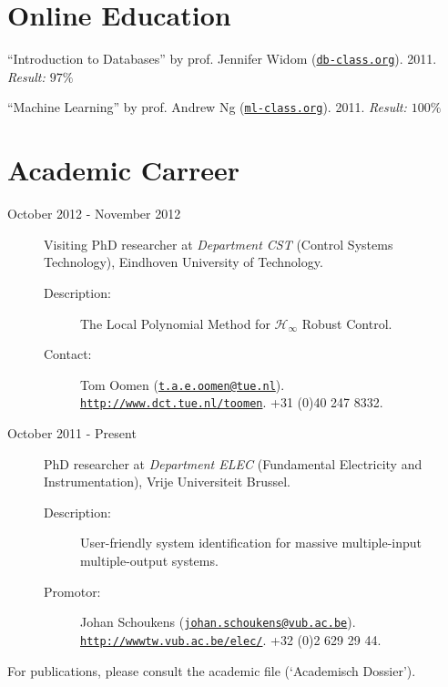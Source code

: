 \documentclass[a4paper]{article}
\renewenvironment{itemize}{
  \begin{list}{}{
    \setlength{\leftmargin}{1.5em}
  }
}{
  \end{list}
}
\begin{document}
\section*{Online Education}
  \begin{itemize}
    \item ``Introduction to Databases'' by prof. Jennifer Widom 
	      (\href{http://www.db-class.org}{\tt db-class.org}). 2011.
	      \textit{Result: $97\%$}
    \item ``Machine Learning'' by prof. Andrew Ng 
	      (\href{http://www.ml-class.org}{\tt ml-class.org}). 2011.
		  \textit{Result: $100\%$}
  \end{itemize}

\section*{Academic Carreer} 
\begin{description}
  \item[October 2012 - November 2012] Visiting PhD researcher at \textit{Department CST} (Control Systems Technology), Eindhoven University of Technology.
    \begin{description}
      \item [Description:] The Local Polynomial Method for $\mathcal{H}_{\infty}$ Robust Control.
      \item [Contact:]
         Tom Oomen (\href{mailto:t.a.e.oomen@tue.nl}{\tt t.a.e.oomen@tue.nl}).\\
         \href{http://www.dct.tue.nl/toomen/}{\tt http://www.dct.tue.nl/toomen}. +31 (0)40 247 8332.
    \end{description}
  \item[October 2011 - Present] PhD researcher at \textit{Department ELEC} (Fundamental Electricity and Instrumentation), Vrije Universiteit Brussel.
    \begin{description}
      \item [Description:] User-friendly system identification for massive multiple-input multiple-output systems.
      \item [Promotor:]
         Johan Schoukens (\href{mailto:johan.schoukens@vub.ac.be}{\tt johan.schoukens@vub.ac.be}).\\
         \href{http://wwwtw.vub.ac.be/elec/}{\tt http://wwwtw.vub.ac.be/elec/}. +32 (0)2 629 29 44.
    \end{description}
\end{description} 
For publications, please consult the academic file (`Academisch Dossier').
\end{document}
